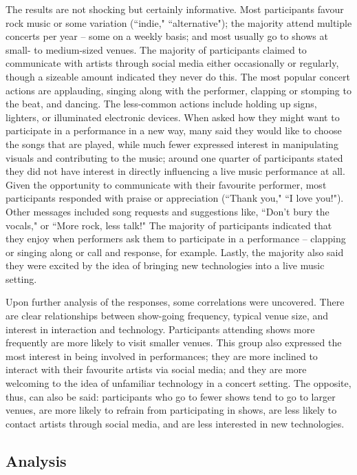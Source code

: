 The results are not shocking but certainly informative. Most participants favour rock music or some variation (``indie," ``alternative"); the majority attend multiple concerts per year -- some on a weekly basis; and most usually go to shows at small- to medium-sized venues. The majority of participants claimed to communicate with artists through social media either occasionally or regularly, though a sizeable amount indicated they never do this. The most popular concert actions are applauding, singing along with the performer, clapping or stomping to the beat, and dancing. The less-common actions include holding up signs, lighters, or illuminated electronic devices. When asked how they might want to participate in a performance in a new way, many said they would like to choose the songs that are played, while much fewer expressed interest in manipulating visuals and contributing to the music; around one quarter of participants stated they did not have interest in directly influencing a live music performance at all. Given the opportunity to communicate with their favourite performer, most participants responded with praise or appreciation (``Thank you," ``I love you!"). Other messages included song requests and suggestions like, ``Don't bury the vocals," or ``More rock, less talk!" The majority of participants indicated that they enjoy when performers ask them to participate in a performance -- clapping or singing along or call and response, for example. Lastly, the majority also said they were excited by the idea of bringing new technologies into a live music setting.

Upon further analysis of the responses, some correlations were uncovered. There are clear relationships between show-going frequency, typical venue size, and interest in interaction and technology. Participants attending shows more frequently are more likely to visit smaller venues. This group also expressed the most interest in being involved in performances; they are more inclined to interact with their favourite artists via social media; and they are more welcoming to the idea of unfamiliar technology in a concert setting. The opposite, thus, can also be said: participants who go to fewer shows tend to go to larger venues, are more likely to refrain from participating in shows, are less likely to contact artists through social media, and are less interested in new technologies.

\subsection{Analysis}

